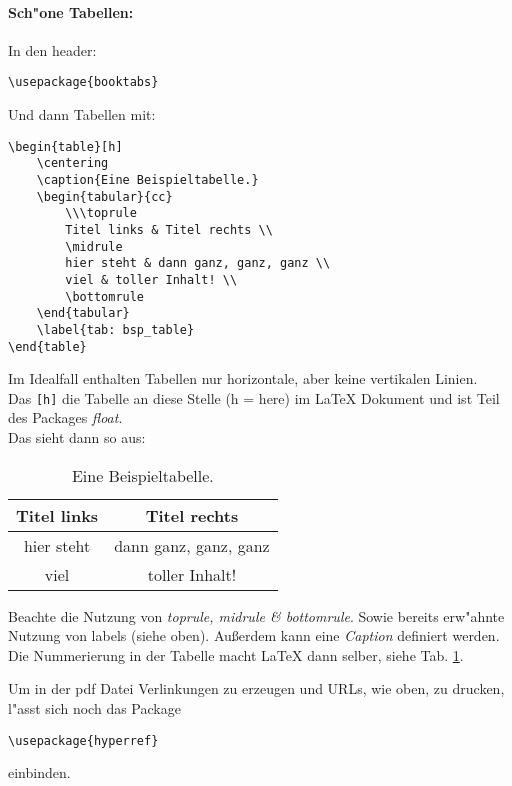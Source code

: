 \documentclass[11pt, a4paper]{article}
\begin{document}
	\paragraph{Sch"one Tabellen:}
	In den header:
	\begin{verbatim}
\usepackage{booktabs}
	\end{verbatim}
	Und dann Tabellen mit:
	\begin{verbatim}
\begin{table}[h]
    \centering
    \caption{Eine Beispieltabelle.}
    \begin{tabular}{cc}
        \\\toprule
        Titel links & Titel rechts \\
        \midrule
        hier steht & dann ganz, ganz, ganz \\
        viel & toller Inhalt! \\
        \bottomrule
    \end{tabular}
    \label{tab: bsp_table}
\end{table}
	\end{verbatim}
	Im Idealfall enthalten Tabellen nur horizontale, aber keine vertikalen Linien.\\
	Das {\tt [h]}  die Tabelle an diese Stelle (h = here) im \LaTeX{} Dokument und ist Teil des Packages \emph{float}.\\
	Das sieht dann so aus:
	\begin{table}[h]
	    \centering
	    \caption{Eine Beispieltabelle.}
	    \begin{tabular}{cc}
	        \\\toprule Titel links & Titel rechts \\
	        \midrule
	        hier steht & dann ganz, ganz, ganz \\
	        viel & toller Inhalt! \\
	        \bottomrule
	    \end{tabular}
	    \label{tab: bsp_table}
	\end{table}

	Beachte die Nutzung von \emph{toprule, midrule \& bottomrule}. Sowie bereits erw"ahnte Nutzung von labels (siehe oben). Au\ss erdem kann eine \emph{Caption} definiert werden. Die Nummerierung in der Tabelle macht \LaTeX{} dann selber, siehe Tab. \ref{tab: bsp_table}.

	Um in der pdf Datei Verlinkungen zu erzeugen und URLs, wie oben, zu drucken, l"asst sich noch das Package
	\begin{verbatim}
\usepackage{hyperref}
	\end{verbatim}
	einbinden.
\end{document}
